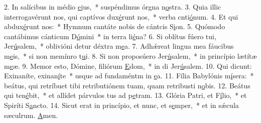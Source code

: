 2. In salícibus in médio \uline{e}jus,~* suspéndimus órgna n\uline{o}stra.
3. Quia illic interrogavérunt nos, qui captívos dux\uline{é}runt nos,~* verba cnti\uline{ó}num.
4. Et qui abdux\uline{é}runt nos:~* Hymnum cantáte nobis de cántcis S\uline{i}on.
5. Quómodo cantábimus cánticum D\uline{ó}mini~* in terra li\uline{é}na?
6. Si oblítus fúero tui, Jer\uline{ú}salem,~* oblivióni detur déxtra m\uline{e}a.
7. Adhǽreat lingua mea fáucibus m\uline{e}is,~* si non memínro t\uline{u}i.
8. Si non proposúero Jer\uline{ú}salem,~* in princípio lætítæ m\uline{e}æ.
9. Memor esto, Dómine, filiórum \uline{E}dom,~* in di Jer\uline{ú}salem.
10. Qui dicunt: Exinaníte, exinan\uline{í}te~* usque ad fundaméntm in \uline{e}a.
11. Fília Babylónis m\uline{í}sera:~* beátus, qui retríbuet tibi retributiónem tuam, quam retribusti n\uline{o}bis.
12. Beátus qui ten\uline{é}bit,~* et allídet párvulos tus ad p\uline{e}tram.
13. Glória Patri, et F\uline{í}lio,~* et Spiríti S\uline{a}ncto.
14. Sicut erat in princípio, et nunc, et s\uline{e}mper,~* et in sǽcula sæculrum. \uline{A}men.

